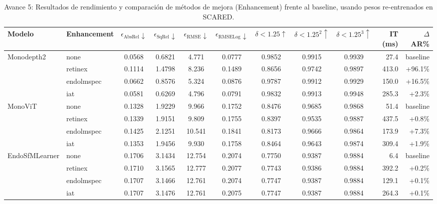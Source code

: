 \begin{table}[t]
\centering
\caption{Avance 5: Resultados de rendimiento y comparación de métodos de mejora (Enhancement) frente al baseline, usando pesos re-entrenados en SCARED.}
\label{tab:avance5}
\setlength{\tabcolsep}{4pt}
\renewcommand{\arraystretch}{1.05}
\small
\begin{tabular}{llcccccccrr}
\toprule
\textbf{Modelo} & \textbf{Enhancement} & $\epsilon_{\text{AbsRel}}\!\downarrow$ & $\epsilon_{\text{SqRel}}\!\downarrow$ & $\epsilon_{\text{RMSE}}\!\downarrow$ & $\epsilon_{\text{RMSELog}}\!\downarrow$ & $\delta\!<\!1.25\!\uparrow$ & $\delta\!<\!1.25^2\!\uparrow$ & $\delta\!<\!1.25^3\!\uparrow$ & IT (ms) & $\Delta$AR\% \\
\midrule
\multirow{4}{*}{Monodepth2}
 & none       & 0.0568 & 0.6821 &  4.771 & 0.0777 & 0.9852 & 0.9915 & 0.9939 &  27.4 & baseline \\
 & retinex    & 0.1114 & 1.4798 &  8.236 & 0.1489 & 0.8656 & 0.9742 & 0.9897 & 413.0 & +96.1\% \\
 & endolmspec & 0.0662 & 0.8576 &  5.324 & 0.0876 & 0.9787 & 0.9912 & 0.9929 & 150.0 & +16.5\% \\
 & iat        & 0.0581 & 0.6269 &  4.796 & 0.0791 & 0.9832 & 0.9913 & 0.9948 & 285.3 & +2.3\% \\
\midrule
\multirow{4}{*}{MonoViT}
 & none       & 0.1328 & 1.9229 &  9.966 & 0.1752 & 0.8476 & 0.9685 & 0.9868 &  51.4 & baseline \\
 & retinex    & 0.1339 & 1.9151 &  9.809 & 0.1755 & 0.8397 & 0.9535 & 0.9887 & 437.5 & +0.8\% \\
 & endolmspec & 0.1425 & 2.1251 & 10.541 & 0.1841 & 0.8173 & 0.9666 & 0.9864 & 173.9 & +7.3\% \\
 & iat        & 0.1353 & 1.9456 &  9.930 & 0.1758 & 0.8464 & 0.9643 & 0.9874 & 309.4 & +1.9\% \\
\midrule
\multirow{4}{*}{EndoSfMLearner}
 & none       & 0.1706 & 3.1434 & 12.754 & 0.2074 & 0.7750 & 0.9387 & 0.9884 &   6.4 & baseline \\
 & retinex    & 0.1710 & 3.1565 & 12.777 & 0.2077 & 0.7743 & 0.9386 & 0.9884 & 392.2 & +0.2\% \\
 & endolmspec & 0.1707 & 3.1466 & 12.761 & 0.2074 & 0.7747 & 0.9387 & 0.9884 & 129.1 & +0.1\% \\
 & iat        & 0.1707 & 3.1476 & 12.761 & 0.2075 & 0.7747 & 0.9387 & 0.9884 & 264.3 & +0.1\% \\

\end{tabular}
\end{table}
